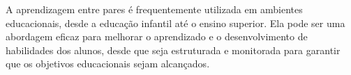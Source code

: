 A aprendizagem entre pares é frequentemente utilizada em ambientes educacionais, desde a educação infantil até o ensino superior. Ela pode ser uma abordagem eficaz para melhorar o aprendizado e o desenvolvimento de habilidades dos alunos, desde que seja estruturada e monitorada para garantir que os objetivos educacionais sejam alcançados.

